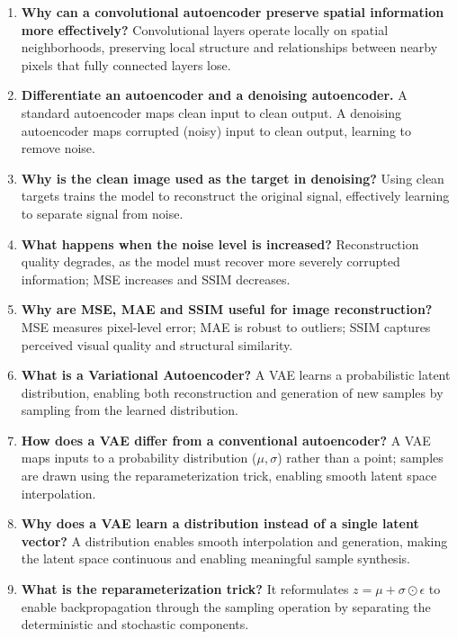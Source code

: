 \documentclass[10pt]{article}
\begin{document}
\begin{enumerate}
\item \textbf{Why can a convolutional autoencoder preserve spatial
information more effectively?} Convolutional layers operate locally on
spatial neighborhoods, preserving local structure and relationships
between nearby pixels that fully connected layers lose.

\item \textbf{Differentiate an autoencoder and a denoising autoencoder.} A
standard autoencoder maps clean input to clean output. A denoising
autoencoder maps corrupted (noisy) input to clean output, learning to
remove noise.

\item \textbf{Why is the clean image used as the target in denoising?}
Using clean targets trains the model to reconstruct the original signal,
effectively learning to separate signal from noise.

\item \textbf{What happens when the noise level is increased?}
Reconstruction quality degrades, as the model must recover more severely
corrupted information; MSE increases and SSIM decreases.

\item \textbf{Why are MSE, MAE and SSIM useful for image reconstruction?}
MSE measures pixel-level error; MAE is robust to outliers; SSIM captures
perceived visual quality and structural similarity.

\item \textbf{What is a Variational Autoencoder?} A VAE learns a
probabilistic latent distribution, enabling both reconstruction and
generation of new samples by sampling from the learned distribution.

\item \textbf{How does a VAE differ from a conventional autoencoder?} A VAE
maps inputs to a probability distribution ($\mu,\sigma$) rather than a
point; samples are drawn using the reparameterization trick, enabling
smooth latent space interpolation.

\item \textbf{Why does a VAE learn a distribution instead of a single
latent vector?} A distribution enables smooth interpolation and
generation, making the latent space continuous and enabling meaningful
sample synthesis.

\item \textbf{What is the reparameterization trick?} It reformulates
$z=\mu+\sigma\odot\epsilon$ to enable backpropagation through the sampling
operation by separating the deterministic and stochastic components.


\end{enumerate}
\end{document}
